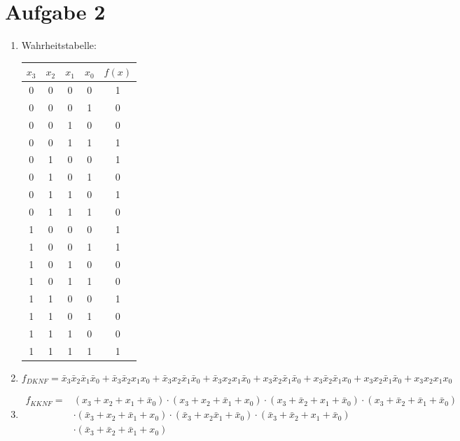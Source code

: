 \documentclass[a4paper]{article}
\begin{document}
\section*{Aufgabe 2}
\begin{enumerate}[label=\alph*)]
	\item Wahrheitstabelle: \\
	\begin{tabular}{cccc|c}
		$x_3$ & $x_2$ & $x_1$ & $x_0$ & $f(x)$ \\
		\hline
		0 & 0 & 0 & 0 & 1 \\
		0 & 0 & 0 & 1 & 0 \\
		0 & 0 & 1 & 0 & 0 \\
		0 & 0 & 1 & 1 & 1 \\
		0 & 1 & 0 & 0 & 1 \\
		0 & 1 & 0 & 1 & 0 \\
		0 & 1 & 1 & 0 & 1 \\
		0 & 1 & 1 & 1 & 0 \\
		1 & 0 & 0 & 0 & 1 \\
		1 & 0 & 0 & 1 & 1 \\
		1 & 0 & 1 & 0 & 0 \\
		1 & 0 & 1 & 1 & 0 \\
		1 & 1 & 0 & 0 & 1 \\
		1 & 1 & 0 & 1 & 0 \\
		1 & 1 & 1 & 0 & 0 \\
		1 & 1 & 1 & 1 & 1 \\
	\end{tabular}
	\item
	\begin{equation*}
		f_{DKNF} = \bar{x}_3\bar{x}_2\bar{x}_1\bar{x}_0 + \bar{x}_3\bar{x}_2x_1x_0 + \bar{x}_3 x_2 \bar{x}_1\bar{x}_0 + \bar{x}_3x_2x_1\bar{x}_0 + x_3\bar{x}_2\bar{x}_1\bar{x}_0 + x_3\bar{x}_2\bar{x}_1x_0 + x_3x_2\bar{x}_1\bar{x}_0 + x_3x_2x_1x_0
	\end{equation*} 
	
	\item 
	\begin{align*}
	f_{KKNF} =  &(x_3 + x_2 + x_1 + \bar{x}_0) \cdot (x_3 + x_2 + \bar{x}_1 + x_0) \cdot (x_3 + \bar{x}_2 + x_1 + \bar{x}_0) \cdot (x_3 + \bar{x}_2 + \bar{x}_1 + \bar{x}_0) \\ &\cdot (\bar{x}_3 + x_2 + \bar{x}_1 + x_0) \cdot (\bar{x}_3 + x_2 \bar{x}_1 + \bar{x}_0) \cdot (\bar{x}_3 + \bar{x}_2 + x_1 +\bar{x}_0) \\ &\cdot (\bar{x}_3 + \bar{x}_2 + \bar{x}_1 + x_0)
	\end{align*}
	

\end{enumerate}
\end{document}
